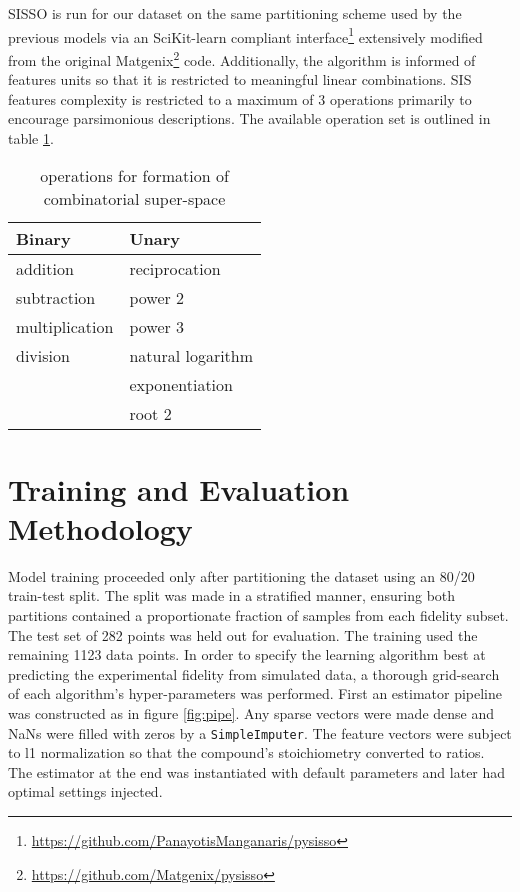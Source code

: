 SISSO is run for our dataset on the same partitioning scheme used by the previous models via an SciKit-learn compliant \autocite{buitinck-2013-api} interface\footnote{\url{https://github.com/PanayotisManganaris/pysisso}} extensively modified from the original Matgenix\footnote{\url{https://github.com/Matgenix/pysisso}} code.
Additionally, the algorithm is informed of features units so that it is restricted to meaningful linear combinations.
SIS features complexity is restricted to a maximum of 3 operations primarily to encourage parsimonious descriptions.
The available operation set is outlined in table \ref{tbl:ops}.

\begin{table}[htbp]
\caption{\label{tbl:ops} operations for formation of combinatorial super-space}
\centering
\begin{tabular}{ll}
Binary & Unary\\[0pt]
\hline
addition & reciprocation\\[0pt]
subtraction & power 2\\[0pt]
multiplication & power 3\\[0pt]
division & natural logarithm\\[0pt]
 & exponentiation\\[0pt]
 & root 2\\[0pt]
\end{tabular}
\end{table}

\section{Training and Evaluation Methodology}
\label{sec:org3f842dd}
Model training proceeded only after partitioning the dataset using an 80/20 train-test split.
The split was made in a stratified manner, ensuring both partitions contained a proportionate fraction of samples from each fidelity subset.
The test set of 282 points was held out for evaluation.
The training used the remaining 1123 data points.
In order to specify the learning algorithm best at predicting the experimental fidelity from simulated data, a thorough grid-search of each algorithm's hyper-parameters was performed.
First an estimator pipeline was constructed as in figure \ref{fig:pipe}.
Any sparse vectors were made dense and NaNs were filled with zeros by a \texttt{SimpleImputer}.
The feature vectors were subject to l1 normalization so that the compound's stoichiometry converted to ratios.
The estimator at the end was instantiated with default parameters and later had optimal settings injected.

